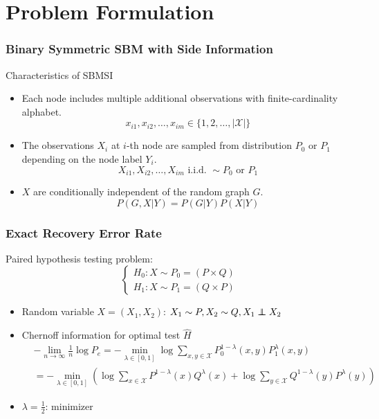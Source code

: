 \documentclass{beamer}
\newcommand\independent{\protect\mathpalette{\protect\independenT}{\perp}}
\def\independenT#1#2{\mathrel{\rlap{$#1#2$}\mkern2mu{#1#2}}}
\begin{document}
\section{Problem Formulation}
\begin{frame}
\frametitle{Binary Symmetric SBM with Side Information}
\begin{block}{Characteristics of SBMSI}
\begin{itemize}
	\item   Each node includes multiple additional observations with
	finite-cardinality alphabet.
	\begin{equation*}
		x_{i1}, x_{i2}, \dots, x_{im} \in \{1, 2, \dots, |\mathcal{X}|\}
	\end{equation*}
	\item The observations $X_i$ at $i$-th node are sampled from distribution $P_0$
	or $P_1$ depending on the node label $Y_i$.
	\begin{equation*}
		X_{i1}, X_{i2}, \dots, X_{im} \textrm{ i.i.d. } \sim P_0 \textrm{ or } P_1
	\end{equation*}
	\item $X$ are conditionally independent of the random
	graph $G$.
	\begin{equation*}
		P(G, X | Y) = P(G | Y) P(X | Y)
	\end{equation*}
\end{itemize}
\end{block}

\end{frame}
\begin{frame}\frametitle{Exact Recovery Error Rate}
Paired hypothesis testing problem:
\begin{equation*}
\begin{cases}
H_0: X \sim P_0=(P \times Q)\\
H_1: X \sim P_1=(Q \times P)
\end{cases}
\end{equation*}
\begin{itemize}
\item Random variable $X=(X_1, X_2)$: $X_1 \sim P, X_2 \sim Q, X_1 \independent X_2$
\item Chernoff information for optimal test $\widehat{H}$
\begin{align*}
&-\lim_{n\to\infty} \frac{1}{n}\log P_e = -\min_{\lambda \in [0,1]}
\log \sum_{x,y\in \mathcal{X}}
P^{1-\lambda}_0(x,y) P^{\lambda}_1(x,y)  \\
&= -\min_{\lambda \in [0,1]}
\left(\log \sum_{x\in \mathcal{X}}
P^{1-\lambda}(x) Q^{\lambda}(x) 
+\log \sum_{y\in \mathcal{X}}
Q^{1-\lambda}(y) P^{\lambda}(y) 
\right)
\end{align*}
\item $\lambda=\frac{1}{2}$: minimizer
\end{itemize}
\end{frame}
\end{document}
